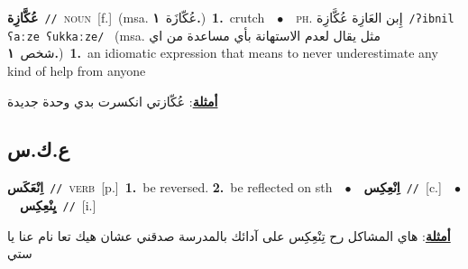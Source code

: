 \documentclass[10pt,a4paper,twoside]{article} %
\begin{document}
\begin{multicols}{2}
{\setlength\topsep{0pt}\textbf{\foreignlanguage{arabic}{عُكَّازِة}}\ {\color{gray}\texttt{//}\color{black}}\ \textsc{noun}\ [f.]\ \color{gray}(msa. \foreignlanguage{arabic}{عُكّازَة}~\foreignlanguage{arabic}{\textbf{١.}})\color{black}\ \textbf{1.}~crutch\ \ $\bullet$\ \ \textsc{ph.} \color{gray} \foreignlanguage{arabic}{إِبن العَازِة عُكَّازِة}\color{black}\ {\color{gray}\texttt{/{\sffamily ʔibnil ʕaːze ʕukkaːze}/}\color{black}}\ \color{gray} (msa. \foreignlanguage{arabic}{مثل يقال لعدم الاستهانة بأي مساعدة من اي شخص}~\foreignlanguage{arabic}{\textbf{١.}})\color{black}\ \textbf{1.}~an idiomatic expression that means to never underestimate any kind of help from anyone\  \begin{flushright}\color{gray}\foreignlanguage{arabic}{\textbf{\underline{\foreignlanguage{arabic}{أمثلة}}}: عُكّازتي انكسرت بدي وحدة جديدة}\end{flushright}\color{black}} \vspace{2mm}

\vspace{-3mm}
\subsection*{\color{blue}\foreignlanguage{arabic}{ع.ك.س}\color{blue}{}} 

{\setlength\topsep{0pt}\textbf{\foreignlanguage{arabic}{اِنْعَكَس}}\ {\color{gray}\texttt{//}\color{black}}\ \textsc{verb}\ [p.]\ \textbf{1.}~be reversed.  \textbf{2.}~be reflected on sth\ \ $\bullet$\ \ \setlength\topsep{0pt}\textbf{\foreignlanguage{arabic}{اِنْعِكِس}}\ {\color{gray}\texttt{//}\color{black}}\ [c.]\ \ $\bullet$\ \ \setlength\topsep{0pt}\textbf{\foreignlanguage{arabic}{يِنْعِكِس}}\ {\color{gray}\texttt{//}\color{black}}\ [i.]\  \begin{flushright}\color{gray}\foreignlanguage{arabic}{\textbf{\underline{\foreignlanguage{arabic}{أمثلة}}}: هاي المشاكل رح تِنْعِكِس على آدائك بالمدرسة صدقني عشان هيك تعا نام عنا يا ستي}\end{flushright}\color{black}} \vspace{2mm}


\end{multicols}
\end{document}
